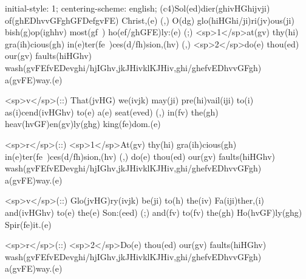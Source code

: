 initial-style: 1;
centering-scheme: english;
(c4)Sol(ed)dier(ghivHGhijvji) of(ghEDhvvGFghGFDefgvFE) Christ,(e) (,) O(dg) glo(hiHGhi/ji)ri(jv)ous(ji) bish(g)op(ighhv) most(gf~) ho(ef/ghGFE)ly:(e) (;) <sp>1</sp>at(gv) thy(hi) gra(ih)cious(gh) in(e)ter(fe~)ces(d/fh)sion,(hv) (,) <sp>2</sp>do(e) thou(ed) our(gv) faults(hiHGhv) wash(gvFEfvEDevghi/hjIGhv,jkJHivklKJHiv,ghi/ghefvEDhvvGFgh) a(gvFE)way.(e)

<sp>v</sp>(::) That(jvHG) we(ivjk) may(ji) pre(hi)vail(iji) to(i) as(i)cend(ivHGhv) to(e) a(e) seat(eved) (,) in(fv) the(gh) heav(hvGF)en(gv)ly(ghg) king(fe)dom.(e)

<sp>r</sp>(::) <sp>1</sp>At(gv) thy(hi) gra(ih)cious(gh) in(e)ter(fe~)ces(d/fh)sion,(hv) (,) do(e) thou(ed) our(gv) faults(hiHGhv) wash(gvFEfvEDevghi/hjIGhv,jkJHivklKJHiv,ghi/ghefvEDhvvGFgh) a(gvFE)way.(e)

<sp>v</sp>(::) Glo(jvHG)ry(ivjk) be(ji) to(h) the(iv) Fa(iji)ther,(i) and(ivHGhv) to(e) the(e) Son:(eed) (;) and(fv) to(fv) the(gh) Ho(hvGF)ly(ghg) Spir(fe)it.(e)

<sp>r</sp>(::) <sp>2</sp>Do(e) thou(ed) our(gv) faults(hiHGhv) wash(gvFEfvEDevghi/hjIGhv,jkJHivklKJHiv,ghi/ghefvEDhvvGFgh) a(gvFE)way.(e)
